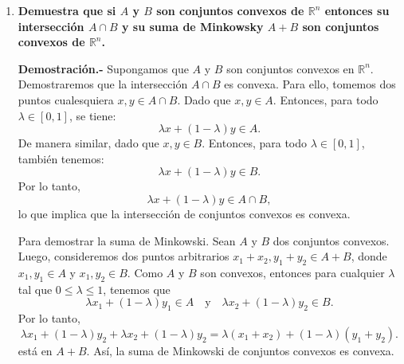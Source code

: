 \begin{enumerate}


    \item \textbf{\boldmath Demuestra que si $A$ y $B$ son conjuntos convexos de $\mathbb{R}^n$ entonces su intersección $A\cap B$ y su suma de Minkowsky $A+B$ son conjuntos convexos de $\mathbb{R}^n$.}

	\textbf{Demostración.-}\; Supongamos que $A$ y $B$ son conjuntos convexos en $\mathbb{R}^n$. Demostraremos que la intersección $A\cap B$ es convexa. Para ello, tomemos dos puntos cualesquiera $x,y\in A\cap B$. Dado que $x,y\in A$. Entonces, para todo $\lambda\in [0,1]$, se tiene:
	$$\lambda x+(1-\lambda)y\in A.$$
	De manera similar, dado que $x,y\in B$. Entonces, para todo $\lambda \in [0,1]$, también tenemos:
	$$\lambda x+(1-\lambda)y\in B.$$
	Por lo tanto, 
	$$\lambda x+(1-\lambda)y\in A\cap B,$$
	lo que implica que la intersección de conjuntos convexos es convexa.

	Para demostrar la suma de Minkowski. Sean $A$ y $B$ dos conjuntos convexos. Luego, consideremos dos puntos arbitrarios $x_1+x_2,y_1+y_2\in A+B$, donde $x_1,y_1\in A$ y $x_1,y_2\in B$. Como $A$ y $B$ son convexos, entonces para cualquier $\lambda$ tal que $0\leq \lambda \leq 1$, tenemos que 
	$$\lambda x_1+(1-\lambda)y_1\in A \quad \text{y}\quad \lambda x_2+(1-\lambda)y_2\in B.$$
	Por lo tanto,
	$$\lambda x_1+(1-\lambda)y_2+\lambda x_2+(1-\lambda)y_2= \lambda(x_1+x_2)+(1-\lambda)(y_1+y_2).$$
	está en $A+B$. Así, la suma de Minkowski de conjuntos convexos es convexa.
	
\end{enumerate}
